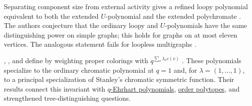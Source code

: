 Separating component size from external activity gives a refined loopy
polynomial equivalent to both the extended $U$-polynomial and the extended
polychromate \cite[Thm.~6.3]{KirillovNenashevShapiroVaintrob2026x}.  The
authors conjecture that the ordinary loopy and $U$-polynomials have the same
distinguishing power on simple graphs; this holds for graphs on at most eleven
vertices.  The analogous statement fails for loopless multigraphs
\cite[Thm.~8.10]{KirillovNenashevShapiroVaintrob2026x}.

, , and
 define
\label{qChromaticPolynomial} by
weighting proper colorings with $q^{\sum_v \lambda_v c(v)}$
\cite{BajoBeckVindasMelendez2024x}.  These polynomials specialize to the
ordinary chromatic polynomial at $q=1$ and, for $\lambda=(1,\dotsc,1)$, to a
principal specialization of Stanley's chromatic symmetric function.  Their
results connect this invariant with \hyperref[ehrhart]{$q$-Ehrhart polynomials},
\hyperref[orderPolytope]{order polytopes}, and strengthened
tree-distinguishing questions.
